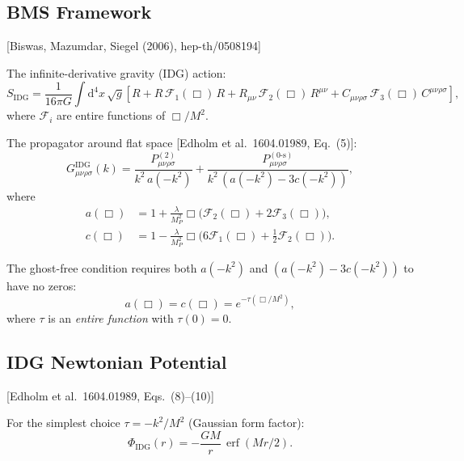 \documentclass[11pt,a4paper]{article}
\theoremstyle{plain}
\theoremstyle{definition}
\theoremstyle{remark}
\renewcommand{\dd}{\mathrm{d}}
\newcommand{\fromlit}[1]{\textcolor{blue!70!black}{\textsf{[#1]}}}
\begin{document}
\subsection{BMS Framework}

\fromlit{Biswas, Mazumdar, Siegel (2006), hep-th/0508194}

The infinite-derivative gravity (IDG) action:
\begin{equation}\label{eq:idg-action}
  S_{\mathrm{IDG}} = \frac{1}{16\pi G}\int\dd^4 x\,\sqrt{g}\left[
    R + R\,\mathcal{F}_1(\Box)\,R
    + R_{\mu\nu}\,\mathcal{F}_2(\Box)\,R^{\mu\nu}
    + C_{\mu\nu\rho\sigma}\,\mathcal{F}_3(\Box)\,C^{\mu\nu\rho\sigma}
  \right],
\end{equation}
where $\mathcal{F}_i$ are entire functions of $\Box/M^2$.

The propagator around flat space \fromlit{Edholm et al.\ 1604.01989,
Eq.~(5)}:
\begin{equation}\label{eq:idg-prop}
  G_{\mu\nu\rho\sigma}^{\mathrm{IDG}}(k)
  = \frac{P^{(2)}_{\mu\nu\rho\sigma}}{k^2\, a(-k^2)}
  + \frac{P^{(0\text{-s})}_{\mu\nu\rho\sigma}}{k^2\,(a(-k^2) - 3c(-k^2))},
\end{equation}
where
\begin{align}
  a(\Box) &= 1 + \frac{\lambda}{M_P^2}\Box\big(
    \mathcal{F}_2(\Box) + 2\mathcal{F}_3(\Box)\big),\\
  c(\Box) &= 1 - \frac{\lambda}{M_P^2}\Box\big(
    6\mathcal{F}_1(\Box) + \tfrac{1}{2}\mathcal{F}_2(\Box)\big).
\end{align}

The ghost-free condition requires both $a(-k^2)$ and
$(a(-k^2) - 3c(-k^2))$ to have no zeros:
\begin{equation}\label{eq:ghost-free}
  a(\Box) = c(\Box) = e^{-\tau(\Box/M^2)},
\end{equation}
where $\tau$ is an \emph{entire function} with $\tau(0) = 0$.

\subsection{IDG Newtonian Potential}

\fromlit{Edholm et al.\ 1604.01989, Eqs.~(8)--(10)}

For the simplest choice $\tau = -k^2/M^2$ (Gaussian form factor):
\begin{equation}\label{eq:Phi-idg}
  \Phi_{\mathrm{IDG}}(r) = -\frac{GM}{r}\,\operatorname{erf}(Mr/2).
\end{equation}
\end{document}

